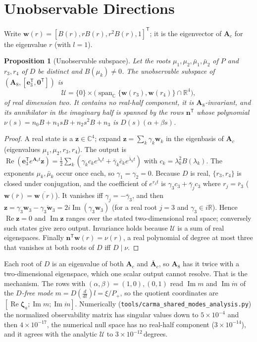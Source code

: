 \documentclass[conference]{IEEEtran}
\DeclareRobustCommand{\vct}[1]{\bm{#1}}
\DeclareRobustCommand{\mat}[1]{\bm{#1}}
\newcommand{\R}{\mathbb{R}}
\newcommand{\C}{\mathbb{C}}
\newcommand{\T}{^{\mathsf T}}
\renewcommand{\Re}{\operatorname{Re}}
\renewcommand{\Im}{\operatorname{Im}}
\theoremstyle{bodysmall}
\newtheorem{proposition}{Proposition}
\begin{document}
\section{Unobservable Directions}
\label{sec:unobs}
Write $\vct w(r)=[B(r),rB(r),r^2B(r),1]\T$; it is the eigenvector of
$\mat A_c$ for the eigenvalue $r$ (with $l=1$).
\begin{proposition}[Unobservable subspace]
\label{prop:U}
Let the roots $\mu_1,\mu_2,\bar\mu_1,\bar\mu_2$ of $P$ and $r_3,r_4$ of $D$
be distinct and $B(\mu_k)\neq0$. The unobservable subspace of
$(\mat A_8,[\vct e_3\T,\vct 0\T])$ is
\begin{equation}
\mathcal U=\{0\}\times\bigl(\operatorname{span}_{\C}\{\vct w(r_3),\vct w(r_4)\}\cap\R^4\bigr),
\end{equation}
of real dimension two. It contains no real-half component, it is
$\mat A_8$-invariant, and its annihilator in the imaginary half is spanned by
the rows $\vct n\T$ whose polynomial
$\nu(s)=n_0B+n_1sB+n_2s^2B+n_3$ is $D(s)(\alpha+\beta s)$.
\end{proposition}
\begin{proof}
A real state is a $\vct z\in\C^4$; expand $\vct z=\sum_k\gamma_k\vct w_k$ in
the eigenbasis of $\mat A_c$ (eigenvalues $\mu_1,\mu_2,r_3,r_4$). The output
is $\Re(\vct e_3\T e^{\mat A_ct}\vct z)=\tfrac12\sum_k(\gamma_kc_ke^{\lambda_kt}
+\bar\gamma_k\bar c_ke^{\bar\lambda_kt})$ with $c_k=\lambda_k^2B(\lambda_k)$.
The exponents $\mu_k,\bar\mu_k$ occur once each, so $\gamma_1=\gamma_2=0$.
Because $D$ is real, $\{r_3,r_4\}$ is closed under conjugation, and the
coefficient of $e^{r_3t}$ is $\gamma_3c_3+\bar\gamma_jc_3$ where
$r_j=\bar r_3$ ($\vct w(\bar r)=\overline{\vct w(r)}$). It vanishes iff
$\gamma_j=-\bar\gamma_3$, and then $\vct z=\gamma_3\vct w_3-\overline{\gamma_3\vct w_3}=2i\Im(\gamma_3\vct w_3)$
(for a real root $j=3$ and $\gamma_3\in i\R$). Hence $\Re\vct z=0$ and
$\Im\vct z$ ranges over the stated two-dimensional real space; conversely
such states give zero output. Invariance holds because $\mathcal U$ is a sum
of real eigenspaces. Finally $\vct n\T\vct w(r)=\nu(r)$, a real polynomial
of degree at most three that vanishes at both roots of $D$ iff $D\mid\nu$.
\end{proof}
Each root of $D$ is an eigenvalue of both $\mat A_c$ and $\bar{\mat A}_c$, so
$\mat A_8$ has it twice with a two-dimensional eigenspace, which one scalar
output cannot resolve. That is the mechanism. The rows with
$(\alpha,\beta)=(1,0),(0,1)$ read $\Im m$ and $\Im\dot m$ of the
\emph{$D$-free mode} $m=D(\tfrac d{dt})l=\xi/P_+$, so the quotient
coordinates are $[\Re\vct\zeta_a;\Im m;\Im\dot m]$. Numerically
(\texttt{tools/carma\_shared\_modes\_analysis.py}) the normalized
observability matrix has singular values down to $5\times10^{-4}$ and then
$4\times10^{-17}$, the numerical null space has no real-half component
($3\times10^{-14}$), and it agrees with the analytic $\mathcal U$ to
$3\times10^{-12}$\,degrees.
\end{document}

